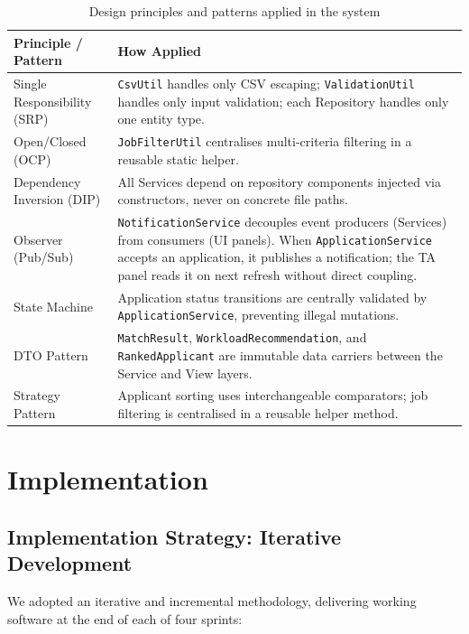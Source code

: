\documentclass[12pt, a4paper]{article}
\begin{document}
\begin{table}[H]
\centering
\renewcommand{\arraystretch}{1.3}
\begin{tabular}{|l|p{10cm}|}
\hline
\textbf{Principle / Pattern} & \textbf{How Applied} \\ \hline
Single Responsibility (SRP) & \texttt{CsvUtil} handles only CSV escaping; \texttt{ValidationUtil} handles only input validation; each Repository handles only one entity type. \\ \hline
Open/Closed (OCP) & \texttt{JobFilterUtil} centralises multi-criteria filtering in a reusable static helper. \\ \hline
Dependency Inversion (DIP) & All Services depend on repository components injected via constructors, never on concrete file paths. \\ \hline
Observer (Pub/Sub) & \texttt{NotificationService} decouples event producers (Services) from consumers (UI panels). When \texttt{ApplicationService} accepts an application, it publishes a notification; the TA panel reads it on next refresh without direct coupling. \\ \hline
State Machine & Application status transitions are centrally validated by \texttt{ApplicationService}, preventing illegal mutations. \\ \hline
DTO Pattern & \texttt{MatchResult}, \texttt{WorkloadRecommendation}, and \texttt{RankedApplicant} are immutable data carriers between the Service and View layers. \\ \hline
Strategy Pattern & Applicant sorting uses interchangeable comparators; job filtering is centralised in a reusable helper method. \\ \hline
\end{tabular}
\caption{Design principles and patterns applied in the system}
\end{table}

\section{Implementation}

\subsection{Implementation Strategy: Iterative Development}
We adopted an iterative and incremental methodology, delivering working software at the end of each of four sprints:
\end{document}
